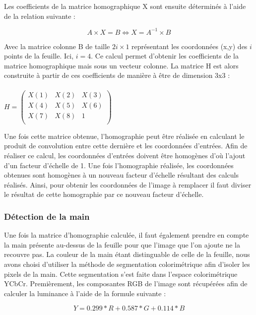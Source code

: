 \documentclass[blue]{ceri/sty/rapport}
\begin{document}
Les coefficients de la matrice homographique X sont ensuite déterminés à l'aide de la relation suivante : 

 \begin{equation}
   A\times X=B \Leftrightarrow X=A^{-1}\times B
\end{equation}

Avec la matrice colonne B de taille $2i\times1$ représentant les coordonnées (x,y) des $i$ points de la feuille. Ici, $i=4$.
Ce calcul permet d'obtenir les coefficients de la matrice homographique mais sous un vecteur colonne. La matrice H est alors construite à partir de ces coefficients de manière à être de dimension 3x3 : \\
\\

$H = \begin{pmatrix}X(1)&X(2)&X(3)\\ 
X(4)&X(5)&X(6)\\ 
X(7)&X(8)&1\\ 
\end{pmatrix}$ 
\vspace{0.5cm}

Une fois cette matrice obtenue, l'homographie peut être réalisée en calculant le produit de convolution entre cette dernière et les coordonnées d'entrées. Afin de réaliser ce calcul, les coordonnées d'entrées doivent être homogènes d'où l'ajout d'un facteur d'échelle de 1. 
Une fois l'homographie réalisée, les coordonnées obtenues sont homogènes à un nouveau facteur d'échelle résultant des calculs réalisés. Ainsi, pour obtenir les coordonnées de l'image à remplacer il faut diviser le résultat de cette homographie par ce nouveau facteur d'échelle. 

\subsubsection{Détection de la main}
Une fois la matrice d'homographie calculée, il faut également prendre en compte la main présente au-dessus de la feuille pour que l'image que l'on ajoute ne la recouvre pas. 
La couleur de la main étant distinguable de celle de la feuille, nous avons choisi d'utiliser la méthode de segmentation colorimétrique afin d'isoler les pixels de la main. Cette segmentation s'est faite dans l'espace colorimétrique YCbCr.
Premièrement, les composantes RGB de l'image sont récupérées afin de calculer la luminance à l'aide de la formule suivante : 

\begin{equation}
   Y= 0.299*R+0.587*G+0.114*B
\end{equation}
\end{document}
